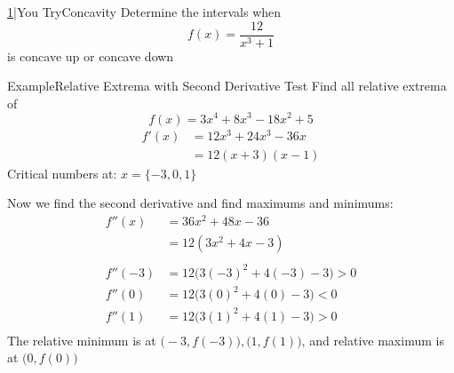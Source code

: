 \documentclass{MathNotes}
\newenvironment{example}[1]{\begin{BlueBox}{Example}{#1}}{\end{BlueBox}}
\newenvironment{practice}[2]{\begin{PurpleBox}{\texorpdfstring{#1}\Big|You Try}{#2}}{\end{PurpleBox}}
\begin{document}
\begin{practice}{\hyperref[ans:3.4-1]{1}}{Concavity}
	\label{prac:3.4-1}
	Determine the intervals when \[f(x)=\frac{12}{x^3+1}\] is concave up
	or concave down
\end{practice}

\newpage
{}
\begin{example}{Relative Extrema with Second Derivative Test}
	Find all relative extrema of $$f(x)=3x^4+8x^3-18x^2+5$$
	\begin{align*}
		f'(x) & =12x^3+24x^3-36x \\
		      & =12(x+3)(x-1)
	\end{align*}
	Critical numbers at: $x=\{-3, 0, 1\}$

	Now we find the second derivative and find maximums and minimums:
	\begin{align*}
		f''(x)  & =36x^2+48x-36                  \\
		        & =12(3x^2+4x-3)                 \\
		\\
		f''(-3) & =12\big(3(-3)^2+4(-3)-3\big)>0 \\
		f''(0)  & =12\big(3(0)^2+4(0)-3\big)<0   \\
		f''(1)  & =12\big(3(1)^2+4(1)-3\big)>0   \\
	\end{align*}
	The relative minimum is at $\big(-3, f(-3)\big), \big(1, f(1)\big)$,
	and relative maximum is at $\big(0, f(0)\big)$
\end{example}
\end{document}
